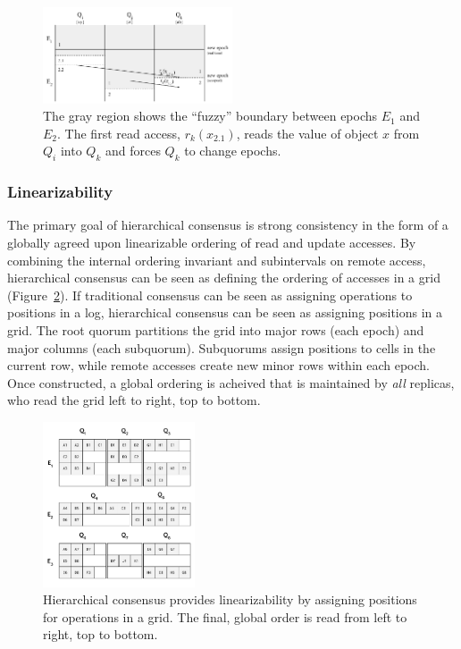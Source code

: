 \documentclass[sigconf]{acmart}
\begin{document}
\begin{figure}[t]
    \centering
    \includegraphics[width=0.5\textwidth]{figures/fuzzy}
    \caption{The gray region shows the ``fuzzy'' boundary between epochs $E_1$
      and $E_2$. The first read access, $r_k(x_{2.1})$, reads the value of object $x$ from $Q_i$ into
      $Q_k$ and forces $Q_k$ to change epochs.}
    \label{fig:fuzzy}
\end{figure}

\subsubsection{Linearizability}

The primary goal of hierarchical consensus is strong consistency in the form of a
globally agreed upon linearizable ordering of read and update accesses.
By combining the internal ordering invariant and subintervals on remote access,
hierarchical consensus can be seen as defining the ordering of accesses in a grid
(Figure~\ref{fig:linearizability}).
If traditional consensus can be seen as assigning operations to positions in a log,
hierarchical consensus can be seen as assigning positions in a grid.
The root quorum partitions the grid into major rows (each epoch) and major columns
(each subquorum).
Subquorums assign positions to cells in the current row, while remote accesses create
new minor rows within each epoch.
Once constructed, a global ordering is acheived that is maintained by \emph{all} replicas,
who read the grid left to right, top to bottom.


\begin{figure}[t]
    \centering
    \includegraphics[width=0.4\textwidth]{figures/linearizability}
    \caption{Hierarchical consensus provides linearizability by assigning positions for operations in a grid. The final, global order is read from left to right, top to bottom.}
    \label{fig:linearizability}
\end{figure}
\end{document}
